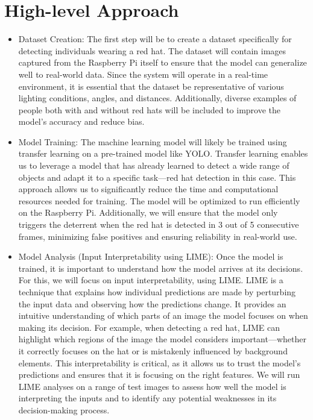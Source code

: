 \section{High-level Approach}
\begin{itemize}
    \item Dataset Creation: The first step will be to create a dataset specifically for detecting individuals wearing a red hat. 
        The dataset will contain images captured from the Raspberry Pi itself to ensure that the model can generalize well to real-world data. 
        Since the system will operate in a real-time environment, it is essential that the dataset be representative of various lighting conditions, angles, and distances. 
        Additionally, diverse examples of people both with and without red hats will be included to improve the model’s accuracy and reduce bias.
    \item Model Training: The machine learning model will likely be trained using transfer learning on a pre-trained model like YOLO. 
        Transfer learning enables us to leverage a model that has already learned to detect a wide range of objects and adapt it to a specific task—red hat detection in this case. 
        This approach allows us to significantly reduce the time and computational resources needed for training. 
        The model will be optimized to run efficiently on the Raspberry Pi. 
        Additionally, we will ensure that the model only triggers the deterrent when the red hat is detected in 3 out of 5 consecutive frames, minimizing false positives and ensuring reliability in real-world use.
    \item Model Analysis (Input Interpretability using LIME): Once the model is trained, it is important to understand how the model arrives at its decisions. 
        For this, we will focus on input interpretability, using LIME. 
        LIME is a technique that explains how individual predictions are made by perturbing the input data and observing how the predictions change. 
        It provides an intuitive understanding of which parts of an image the model focuses on when making its decision. 
        For example, when detecting a red hat, LIME can highlight which regions of the image the model considers important—whether it correctly focuses on the hat or is mistakenly influenced by background elements. 
        This interpretability is critical, as it allows us to trust the model's predictions and ensures that it is focusing on the right features. 
        We will run LIME analyses on a range of test images to assess how well the model is interpreting the inputs and to identify any potential weaknesses in its decision-making process.

\end{itemize}
